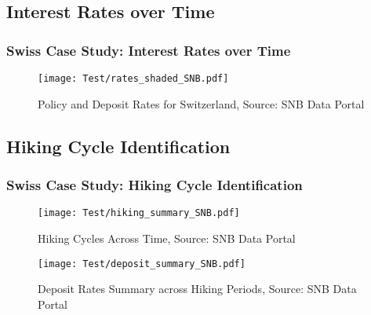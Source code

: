 \documentclass{beamer}
\begin{document}
\subsection{Interest Rates over Time}
\begin{frame}
\frametitle{Swiss Case Study: Interest Rates over Time}
\begin{center}
\begin{minipage}{1\textwidth}
\begin{figure}[H]
    \texttt{[image: Test/rates\_shaded\_SNB.pdf]}
    \caption{Policy and Deposit Rates for Switzerland, Source: SNB Data Portal \cite{snb2023}}
    \label{fig:rates_shaded}
\end{figure}
\end{minipage}
\end{center}
\end{frame}

\subsection{Hiking Cycle Identification}
\begin{frame}
\frametitle{Swiss Case Study: Hiking Cycle Identification}

\begin{center}
\begin{minipage}{1\textwidth}
\begin{figure}[H]
    \texttt{[image: Test/hiking\_summary\_SNB.pdf]}
    \caption{Hiking Cycles Across Time, Source: SNB Data Portal \cite{snb2023}}
    \label{fig:hiking_summary}
\end{figure}
\end{minipage}
\end{center}

\begin{center}
\begin{minipage}{1\textwidth}
\begin{figure}[H]
    \texttt{[image: Test/deposit\_summary\_SNB.pdf]}
    \caption{Deposit Rates Summary across Hiking Periods, Source: SNB Data Portal \cite{snb2023}}
    \label{fig:deposit_summary}
\end{figure}
\end{minipage}
\end{center}
\end{frame}
\end{document}
